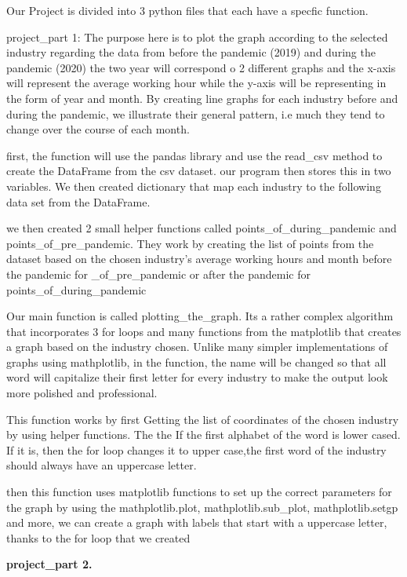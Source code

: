 \documentclass[fontsize=11pt]{article}
\begin{document}
Our Project is divided into 3 python files that each have a specfic function.
  
project\_part 1: The purpose here is to plot the graph according to the selected industry regarding the data from before the pandemic (2019) and during the pandemic (2020) the two year will correspond o 2 different graphs and the x-axis will represent the average working hour while the y-axis
will be representing in the form of year and month. By creating line graphs for each industry before and during the pandemic, we illustrate their general pattern, i.e  much they tend to change over the course of each month. 

first, the function will use the pandas library and use the read\_csv method to create the DataFrame from the csv dataset. our program then stores this in
two variables.
We then created dictionary that map each industry  to the following data set from the DataFrame.

we then created 2 small helper functions called points\_of\_during\_pandemic
and points\_of\_pre\_pandemic. They work by creating the list of points from the dataset based on the chosen industry's average working hours and month before the pandemic for \_of\_pre\_pandemic or after the pandemic for points\_of\_during\_pandemic

Our main function is called plotting\_the\_graph. Its a rather complex algorithm that incorporates 3 for loops and many functions from the matplotlib that creates a graph based on the industry chosen. Unlike many simpler implementations of graphs using mathplotlib, in the function, the name will be changed so that all word will capitalize their first letter for every industry to make the output look more polished and professional.

This function works by first Getting the list of coordinates of the chosen industry by using helper functions. The the If the first alphabet of the word is lower cased. If it is, then the for loop changes it to upper case,the first word of the industry should always have an uppercase letter.


then this function uses matplotlib functions to set up the correct parameters for the graph by using the mathplotlib.plot, mathplotlib.sub\_plot, mathplotlib.setgp and more, we can create a graph with labels that start with a uppercase letter, thanks to the for loop that we created


\textbf{project\_part 2.}
\end{document}
